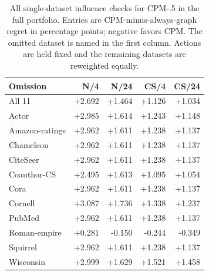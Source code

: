 \begin{table}[tbp]
\centering
\caption{All single-dataset influence checks for CPM-.5 in the full portfolio. Entries are CPM-minus-always-graph regret in percentage points; negative favors CPM. The omitted dataset is named in the first column. Actions are held fixed and the remaining datasets are reweighted equally.}
\label{tab:cpm_all_omissions}
\small
\setlength{\tabcolsep}{3pt}
\begin{tabular}{@{}lrrrr@{}}
\toprule
Omission & N/4 & N/24 & CS/4 & CS/24 \\
\midrule
All 11 & +2.692 & +1.464 & +1.126 & +1.034 \\
Actor & +2.985 & +1.614 & +1.243 & +1.148 \\
Amazon-ratings & +2.962 & +1.611 & +1.238 & +1.137 \\
Chameleon & +2.962 & +1.611 & +1.238 & +1.137 \\
CiteSeer & +2.962 & +1.611 & +1.238 & +1.137 \\
Coauthor-CS & +2.495 & +1.613 & +1.095 & +1.054 \\
Cora & +2.962 & +1.611 & +1.238 & +1.137 \\
Cornell & +3.087 & +1.736 & +1.338 & +1.237 \\
PubMed & +2.962 & +1.611 & +1.238 & +1.137 \\
Roman-empire & +0.281 & -0.150 & -0.244 & -0.349 \\
Squirrel & +2.962 & +1.611 & +1.238 & +1.137 \\
Wisconsin & +2.999 & +1.629 & +1.521 & +1.458 \\
\bottomrule
\end{tabular}
\end{table}

